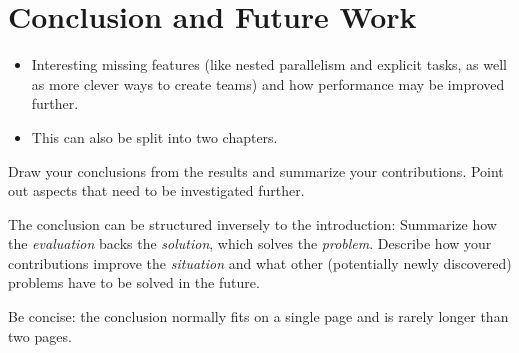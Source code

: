 \chapter{Conclusion and Future Work}
\label{ch:conclusion}

\begin{itemize}
	\item Interesting missing features (like nested parallelism and explicit tasks, as well as more
	      clever ways to create teams) and how performance may be improved further.
    \item This can also be split into two chapters.
\end{itemize}

{\color{red}
Draw your conclusions from the results and summarize your contributions.
Point out aspects that need to be investigated further.

The conclusion can be structured inversely to the introduction:
Summarize how the \emph{evaluation} backs the \emph{solution}, which solves the \emph{problem}.
Describe how your contributions improve the \emph{situation} and what other (potentially newly discovered) problems have to be solved in the future.

Be concise: the conclusion normally fits on a single page and is rarely longer than two pages.
}

